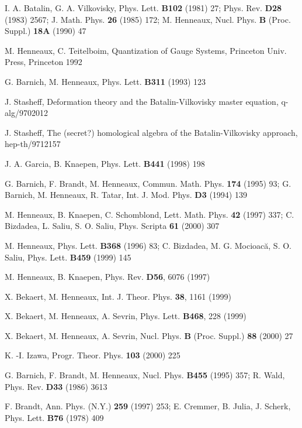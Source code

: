\documentclass[a4paper,12pt]{article}
\begin{document}
\begin{thebibliography}{99}
  I. A. Batalin, G. A. Vilkovisky,
Phys. Lett. \textbf{B102}
(1981) 27; Phys. Rev. \textbf{D28} (1983) 2567;
J. Math. Phys. \textbf{26}
(1985) 172; M. Henneaux, Nucl. Phys. \textbf{B}
(Proc. Suppl.) \textbf{18A}
(1990) 47

  M. Henneaux, C. Teitelboim,
Quantization of Gauge Systems,
Princeton Univ. Press, Princeton 1992

  G. Barnich, M. Henneaux,
Phys. Lett. \textbf{B311} (1993) 123

  J. Stasheff, Deformation
theory and the Batalin-Vilkovisky
master equation, q-alg/9702012

  J. Stasheff, The (secret?)
homological algebra of the
Batalin-Vilkovisky approach, hep-th/9712157

  J. A. Garcia, B. Knaepen,
Phys. Lett. \textbf{B441} (1998) 198

  G. Barnich, F. Brandt, M.
Henneaux, Commun. Math. Phys. \textbf{%
174} (1995) 93; G. Barnich, M. Henneaux,
R. Tatar, Int. J. Mod. Phys.
\textbf{D3} (1994) 139

  M. Henneaux, B. Knaepen, C.
Schomblond, Lett. Math. Phys.
\textbf{42} (1997) 337; C. Bizdadea, L.
Saliu, S. O. Saliu, Phys. Scripta
\textbf{61} (2000) 307

  M. Henneaux, Phys. Lett.
\textbf{B368} (1996) 83; C. Bizdadea,
M. G. Mocioac\u {a}, S. O. Saliu, Phys.
Lett. \textbf{B459} (1999) 145

  M. Henneaux, B. Knaepen,
Phys. Rev. \textbf{D56}, 6076 (1997)

  X. Bekaert, M. Henneaux,
Int. J. Theor. Phys. \textbf{38},
1161 (1999)

  X. Bekaert, M. Henneaux,
A. Sevrin, Phys. Lett. \textbf{B468},
228 (1999)

  X. Bekaert, M. Henneaux,
A. Sevrin, Nucl. Phys. \textbf{B}
(Proc. Suppl.) \textbf{88} (2000) 27

  K. -I. Izawa, Progr. Theor.
Phys. \textbf{103} (2000) 225

  G. Barnich, F. Brandt,
M. Henneaux, Nucl. Phys. \textbf{B455}
(1995) 357; R. Wald, Phys. Rev.
\textbf{D33} (1986) 3613

  F. Brandt, Ann. Phys.
(N.Y.) \textbf{259} (1997) 253; E.
Cremmer, B. Julia, J. Scherk, Phys.
Lett. \textbf{B76} (1978) 409


\end{thebibliography}
\end{document}
